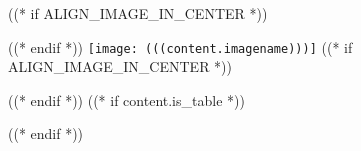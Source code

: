 ((* if ALIGN_IMAGE_IN_CENTER *))\begin{center}((* endif *))
\texttt{[image: (((content.imagename)))]}
((* if ALIGN_IMAGE_IN_CENTER *))\end{center}((* endif *))
((* if content.is_table *))\par\vspace{-5pt}((* endif *))
